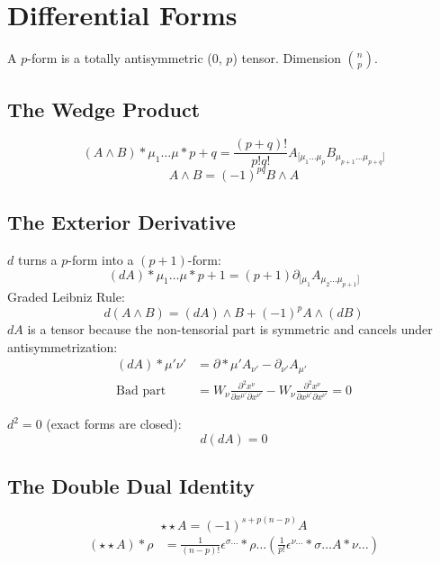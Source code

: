 \documentclass[11pt, a4paper]{report}
\begin{document}
\section{Differential Forms}
A $p$-form is a totally antisymmetric (0, $p$) tensor. Dimension $\binom{n}{p}$.

\subsection*{The Wedge Product}
\begin{equation} (A \wedge B)*{\mu_1 \dots \mu*{p+q}} = \frac{(p+q)!}{p!q!} A_{[\mu_1 \dots \mu_p} B_{\mu_{p+1} \dots \mu_{p+q}]} \end{equation}
\begin{equation} A \wedge B = (-1)^{pq} B \wedge A \end{equation}

\subsection*{The Exterior Derivative}
$d$ turns a $p$-form into a $(p+1)$-form:
\begin{equation} (dA)*{\mu_1 \dots \mu*{p+1}} = (p+1) \partial_{[\mu_1} A_{\mu_2 \dots \mu_{p+1}]} \end{equation}
Graded Leibniz Rule:
\begin{equation} d(A \wedge B) = (dA) \wedge B + (-1)^p A \wedge (dB) \end{equation}
$dA$ is a tensor because the non-tensorial part is symmetric and cancels under antisymmetrization:
\begin{align*}
(dA)*{\mu'\nu'} &= \partial*{\mu'} A_{\nu'} - \partial_{\nu'} A_{\mu'} \\
\text{Bad part} &= W_\nu \frac{\partial^2 x^\nu}{\partial x^{\mu'} \partial x^{\nu'}} - W_\nu \frac{\partial^2 x^\nu}{\partial x^{\mu'} \partial x^{\nu'}} = 0
\end{align*}


$d^2=0$ (exact forms are closed):
\begin{equation} d(dA) = 0 \end{equation}

\subsection*{The Double Dual Identity}
\begin{equation} \star\star A = (-1)^{s + p(n-p)} A \end{equation}
\begin{align*}
(\star\star A)*{\rho} &= \frac{1}{(n-p)!} \epsilon^{\sigma \dots}*{\rho \dots} \left( \frac{1}{p!} \epsilon^{\nu \dots}*{\sigma \dots} A*{\nu \dots} \right)
\end{align*}
\end{document}
